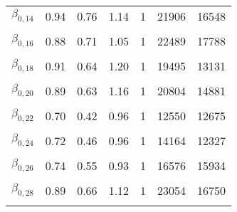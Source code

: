 \begin{table}
\begin{tabular}[t]{lrrrrrr}
$\beta_{0, 14}$ & 0.94 & 0.76 & 1.14 & 1 & 21906 & 16548\\
\cellcolor{gray!6}{$\beta_{0, 15}$} & \cellcolor{gray!6}{0.98} & \cellcolor{gray!6}{0.76} & \cellcolor{gray!6}{1.21} & \cellcolor{gray!6}{1} & \cellcolor{gray!6}{22916} & \cellcolor{gray!6}{17711}\\
$\beta_{0, 16}$ & 0.88 & 0.71 & 1.05 & 1 & 22489 & 17788\\
\cellcolor{gray!6}{$\beta_{0, 17}$} & \cellcolor{gray!6}{0.82} & \cellcolor{gray!6}{0.60} & \cellcolor{gray!6}{1.03} & \cellcolor{gray!6}{1} & \cellcolor{gray!6}{16936} & \cellcolor{gray!6}{13195}\\
$\beta_{0, 18}$ & 0.91 & 0.64 & 1.20 & 1 & 19495 & 13131\\
\cellcolor{gray!6}{$\beta_{0, 19}$} & \cellcolor{gray!6}{0.88} & \cellcolor{gray!6}{0.66} & \cellcolor{gray!6}{1.11} & \cellcolor{gray!6}{1} & \cellcolor{gray!6}{22297} & \cellcolor{gray!6}{16339}\\
$\beta_{0, 20}$ & 0.89 & 0.63 & 1.16 & 1 & 20804 & 14881\\
\cellcolor{gray!6}{$\beta_{0, 21}$} & \cellcolor{gray!6}{0.59} & \cellcolor{gray!6}{0.33} & \cellcolor{gray!6}{0.83} & \cellcolor{gray!6}{1} & \cellcolor{gray!6}{7833} & \cellcolor{gray!6}{9548}\\
$\beta_{0, 22}$ & 0.70 & 0.42 & 0.96 & 1 & 12550 & 12675\\
\cellcolor{gray!6}{$\beta_{0, 23}$} & \cellcolor{gray!6}{0.91} & \cellcolor{gray!6}{0.71} & \cellcolor{gray!6}{1.11} & \cellcolor{gray!6}{1} & \cellcolor{gray!6}{21470} & \cellcolor{gray!6}{16659}\\
$\beta_{0, 24}$ & 0.72 & 0.46 & 0.96 & 1 & 14164 & 12327\\
\cellcolor{gray!6}{$\beta_{0, 25}$} & \cellcolor{gray!6}{0.97} & \cellcolor{gray!6}{0.77} & \cellcolor{gray!6}{1.19} & \cellcolor{gray!6}{1} & \cellcolor{gray!6}{20966} & \cellcolor{gray!6}{18678}\\
$\beta_{0, 26}$ & 0.74 & 0.55 & 0.93 & 1 & 16576 & 15934\\
\cellcolor{gray!6}{$\beta_{0, 27}$} & \cellcolor{gray!6}{0.83} & \cellcolor{gray!6}{0.69} & \cellcolor{gray!6}{0.97} & \cellcolor{gray!6}{1} & \cellcolor{gray!6}{29533} & \cellcolor{gray!6}{17494}\\
$\beta_{0, 28}$ & 0.89 & 0.66 & 1.12 & 1 & 23054 & 16750\\
\cellcolor{gray!6}{$\beta_{0, 29}$} & \cellcolor{gray!6}{0.84} & \cellcolor{gray!6}{0.56} & \cellcolor{gray!6}{1.12} & \cellcolor{gray!6}{1} & \cellcolor{gray!6}{17637} & \cellcolor{gray!6}{11660}\\

\end{tabular}
\end{table}
